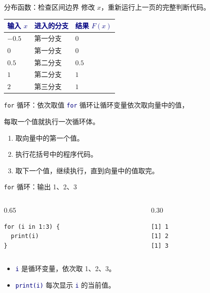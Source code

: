 \documentclass[14pt,compress,t,noamsthm,notheorem,table,handout,fontset=none]{ctexbeamer}
\newcommand{\code}[1]{\textcolor{navy}{\texttt{#1}}}
\newcommand{\inputlabel}{\par\smallskip{\fontsize{10.5}{13}\selectfont\bfseries\color{muted}输入代码\par}}
\newcommand{\outputlabel}{\par\smallskip{\fontsize{10.5}{13}\selectfont\bfseries\color{muted}Console 输出\par}}
\newcommand{\thead}[1]{\textcolor{navy}{\textbf{#1}}}
\begin{document}
\begin{frame}{分布函数：检查区间边界}
  修改 $x$，重新运行上一页的完整判断代码。
  \par\vspace{0.4em}
  \renewcommand{\arraystretch}{1.3}
  \begin{tabular*}{\linewidth}{@{\extracolsep{\fill}}lll@{}}
    \toprule
    \thead{输入 $x$} & \thead{进入的分支} & \thead{结果 $F(x)$} \\
    \midrule
    $-0.5$ & 第一分支 & $0$ \\
    $0$ & 第一分支 & $0$ \\
    $0.5$ & 第二分支 & $0.5$ \\
    $1$ & 第二分支 & $1$ \\
    $2$ & 第三分支 & $1$ \\
    \bottomrule
  \end{tabular*}
\end{frame}

\begin{frame}{\texttt{for} 循环：依次取值}
  \code{for} 循环让循环变量依次取向量中的值，\par
  每取一个值就执行一次循环体。
  \par\vspace{0.5em}
  \begin{enumerate}
    \item 取向量中的第一个值。
    \item 执行花括号中的程序代码。
    \item 取下一个值，继续执行，直到向量中的值取完。
  \end{enumerate}
\end{frame}

\begin{frame}[fragile]{\texttt{for} 循环：输出 1、2、3}
  \begin{columns}[T,onlytextwidth]
    \begin{column}{0.65\textwidth}
      \inputlabel
\begin{lstlisting}
for (i in 1:3) {
  print(i)
}
\end{lstlisting}
    \end{column}
    \begin{column}{0.30\textwidth}
      \outputlabel
\begin{lstlisting}[style=output]
[1] 1
[1] 2
[1] 3
\end{lstlisting}
    \end{column}
  \end{columns}
  \begin{itemize}
    \item \code{i} 是循环变量，依次取 1、2、3。
    \item \code{print(i)} 每次显示 \code{i} 的当前值。
  \end{itemize}
\end{frame}
\end{document}
